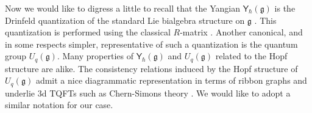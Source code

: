 \documentclass[10pt]{article}
\theoremstyle{definition}
\def\fg{\mathfrak{g}}
\def\myY{{\mathsf{Y}}}
\numberwithin{equation}{section}
\begin{document}
Now we would like to digress a little to recall that the Yangian $\myY_{\hbar}(\fg)$ is the Drinfeld quantization of the standard Lie bialgebra structure on $\fg$ \cite{drinfeld1990quasi,Tolstoy2003}.
This quantization is performed using the classical $R$-matrix \cite{Belavin1982}.
Another canonical, and in some respects simpler, representative of such a quantization is the quantum group $U_q(\fg)$.
Many properties of $\myY_{\hbar}(\fg)$ and $U_q(\fg)$ related to the Hopf structure are alike.
The consistency relations induced by the Hopf structure of $U_q(\fg)$ admit a nice diagrammatic representation in terms of ribbon graphs \cite{RT1,RT2,1112.2654,Mironov:2015aia,Mironov:2015qma,Anokhina:2024lbn,Galakhov:2014sha} and underlie 3d TQFTs such as Chern-Simons theory \cite{Witten:1988hf}.
We would like to adopt a similar notation for our case.
\end{document}
